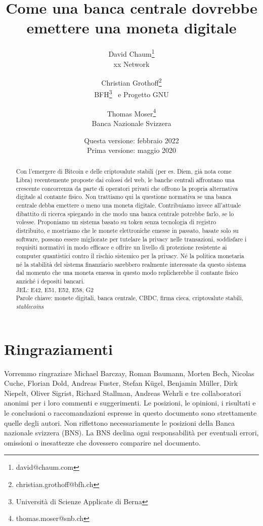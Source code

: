 \documentclass[a4paper]{article}
\title{Come una banca centrale dovrebbe emettere una moneta digitale}
\author{David Chaum\footnote{david@chaum.com} \\
  xx Network \and
  Christian Grothoff\footnote{christian.grothoff@bfh.ch} \\
  BFH\footnote{Università di Scienze Applicate di Berna}
  \ e Progetto GNU \and
  Thomas Moser\footnote{thomas.moser@snb.ch} \\
  Banca Nazionale Svizzera}
\date{Questa versione: febbraio 2022 \\
      Prima versione:  maggio 2020}
\begin{document}
\maketitle

\begin{abstract}
Con l'emergere di Bitcoin e delle criptovalute stabili (per es. Diem,
già nota come Libra) recentemente proposte dai colossi del web, le
banche centrali affrontano una crescente concorrenza da parte di
operatori privati che offrono la propria alternativa digitale al
contante fisico. Non trattiamo qui la questione normativa se una banca
centrale debba emettere o meno una moneta digitale. Contribuiamo invece
all'attuale dibattito di ricerca spiegando in che modo una banca centrale
potrebbe farlo, se lo volesse. Proponiamo un sistema basato su token
senza tecnologia di registro distribuito, e mostriamo che le monete
elettroniche emesse in passato, basate solo su software, possono essere
migliorate per tutelare la privacy nelle transazioni, soddisfare i
requisiti normativi in modo efficace e offrire un livello di protezione
resistente ai computer quantistici contro il rischio sistemico per
la privacy. Né la politica monetaria né la stabilità del sistema
finanziario sarebbero realmente interessate da questo sistema dal
momento che una moneta emessa in questo modo replicherebbe il contante
fisico anziché i depositi bancari. \\

JEL: E42, E51, E52, E58, G2
\\

Parole chiave: monete digitali, banca centrale, CBDC, firma cieca,
criptovalute stabili, \textit{stablecoins}
\end{abstract}

\vspace{40pt}

\section*{Ringraziamenti}
Vorremmo ringraziare Michael Barczay, Roman Baumann, Morten Bech,
Nicolas Cuche, Florian Dold, Andreas Fuster, Stefan Kügel, Benjamin
Müller, Dirk Niepelt, Oliver Sigrist, Richard Stallman, Andreas Wehrli
e tre collaboratori anonimi per i loro commenti e suggerimenti. Le
posizioni, le opinioni, i risultati e le conclusioni o raccomandazioni
espresse in questo documento sono strettamente quelle degli autori.
Non riflettono necessariamente le posizioni della Banca nazionale
svizzera (BNS). La BNS declina ogni responsabilità per eventuali
errori, omissioni o inesattezze che dovessero comparire nel documento.
\end{document}
